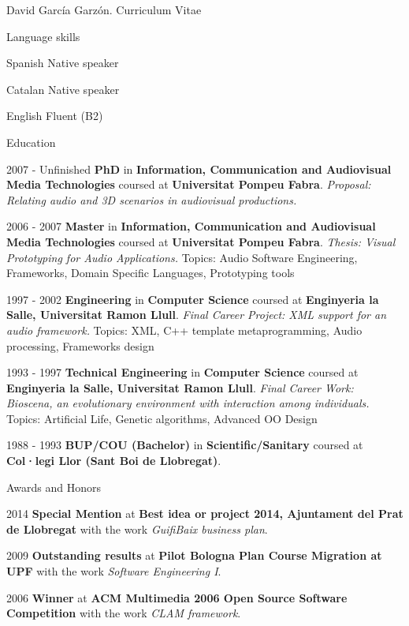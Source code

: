 \documentclass{article}
\begin{document}
\begin{cv}{David García Garzón. Curriculum Vitae}
\begin{cvlist}{Language skills}
\item[Spanish] Native speaker
\item[Catalan] Native speaker
\item[English] Fluent (B2)

\end{cvlist}


\begin{cvlist}{Education}

\item[2007 - Unfinished]
{\bf PhD} in {\bf Information, Communication and Audiovisual Media Technologies}
coursed at {\bf Universitat Pompeu Fabra}.
{\em Proposal: Relating audio and 3D scenarios in audiovisual productions.}
\item[2006 - 2007]
{\bf Master} in {\bf Information, Communication and Audiovisual Media Technologies}
coursed at {\bf Universitat Pompeu Fabra}.
{\em Thesis: Visual Prototyping for Audio Applications.}
Topics: Audio Software Engineering, Frameworks, Domain Specific Languages, Prototyping tools
\item[1997 - 2002]
{\bf Engineering} in {\bf Computer Science}
coursed at {\bf Enginyeria la Salle, Universitat Ramon Llull}.
{\em Final Career Project: XML support for an audio framework.}
Topics: XML, C++ template metaprogramming, Audio processing, Frameworks design
\item[1993 - 1997]
{\bf Technical Engineering} in {\bf Computer Science}
coursed at {\bf Enginyeria la Salle, Universitat Ramon Llull}.
{\em Final Career Work: Bioscena, an evolutionary environment with interaction among individuals.}
Topics: Artificial Life, Genetic algorithms, Advanced OO Design
\item[1988 - 1993]
{\bf BUP/COU (Bachelor)} in {\bf Scientific/Sanitary}
coursed at {\bf Col·legi Llor (Sant Boi de Llobregat)}.
{\em }
\end{cvlist}

\begin{cvlist}{Awards and Honors}

\item[2014]
{\bf Special Mention}
at {\bf Best idea or project 2014, Ajuntament del Prat de Llobregat}
with the work {\em GuifiBaix business plan}.
\item[2009]
{\bf Outstanding results}
at {\bf Pilot Bologna Plan Course Migration at UPF}
with the work {\em Software Engineering I}.
\item[2006]
{\bf Winner}
at {\bf ACM Multimedia 2006 Open Source Software Competition}
with the work {\em CLAM framework}.
\end{cvlist}


\end{cv}
\end{document}

